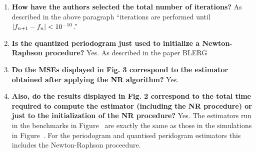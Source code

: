 \documentclass[a4paper,10pt]{article}
\begin{document}
\begin{enumerate}
\begin{enumerate}


\item \textbf{How have the authors selected the total number of iterations?} 
As described in the above paragraph ``iterations are performed until $\vert f_{n+1}-f_n \vert < 10^{-10}$.''




\item \textbf{Is the quantized periodogram just used to initialize a Newton-Raphson procedure?}
Yes.  As described in the paper BLERG

\item \textbf{Do the MSEs displayed in Fig. 3 correspond to the estimator obtained after applying the NR algorithm?}
Yes.

\item \textbf{Also, do the results displayed in Fig. 2 correspond to the total time
required to compute the estimator (including the NR procedure) or just to the
initialization of the NR procedure?}
Yes. The estimators run in the benchmarks in Figure~ are exactly the same as those in the simulations in Figure~.  For the periodogram and quantised peridogram estimators this includes the Newton-Raphson proceedure.


\end{enumerate}
\end{enumerate}
\end{document}

